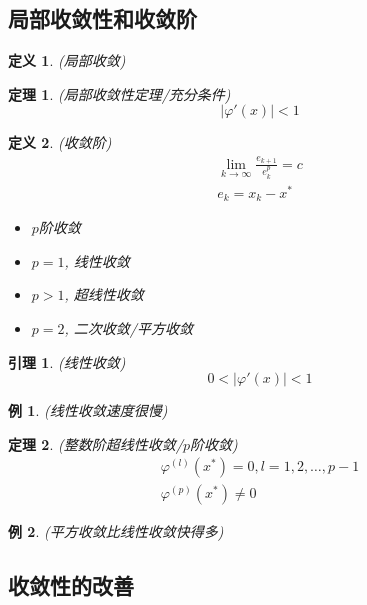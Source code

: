 \documentclass[twoside]{article}
\newtheorem{theorem}{定理}[section]
\newtheorem{lemma}{引理}[section]
\newtheorem{definition}{定义}[section]
\newtheorem{eg}{例}[section]
\begin{document}
\subsection{局部收敛性和收敛阶}
\begin{definition}
  (局部收敛)
\end{definition}
\begin{theorem}
  (局部收敛性定理/充分条件)
  \begin{equation}
    |\varphi'(x)|<1
  \end{equation}
\end{theorem}
\begin{definition}
  (收敛阶)
  \begin{equation}
    \begin{aligned}
      \lim_{k\to \infty} \frac{e_{k+1}}{e^p_k}=c \\
      e_k=x_k - x^*
    \end{aligned}
  \end{equation}
  \begin{itemize}
    \item $p$阶收敛
    \item $p=1$, 线性收敛
    \item $p>1$, 超线性收敛
    \item $p=2$, 二次收敛/平方收敛
  \end{itemize}
\end{definition}
\begin{lemma}
  (线性收敛)
  \begin{equation}
    0<|\varphi'(x)|<1
  \end{equation}
\end{lemma}
\begin{eg}
  (线性收敛速度很慢)
\end{eg}
\begin{theorem}
  (整数阶超线性收敛/$p$阶收敛)
  \begin{equation}
    \begin{aligned}
      \varphi^{(l)}(x^*)=0, l=1,2,\ldots,p-1 \\
      \varphi^{(p)}(x^*)\ne0
    \end{aligned}
  \end{equation}
\end{theorem}
\begin{eg}
  (平方收敛比线性收敛快得多)
\end{eg}

\subsection{收敛性的改善}\label{sub:label_name}
\end{document}
